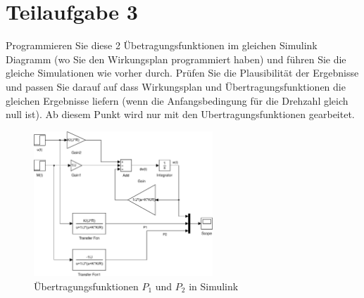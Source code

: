 \section{Teilaufgabe 3}
\begin{aufgabe}
Programmieren Sie diese 2 Übetragungsfunktionen im gleichen Simulink Diagramm 
(wo Sie den Wirkungsplan programmiert haben) und führen Sie die gleiche 
Simulationen wie vorher durch. Prüfen Sie die Plausibilität der Ergebnisse 
und passen Sie darauf auf dass Wirkungsplan und Übertragungsfunktionen die 
gleichen Ergebnisse liefern (wenn die Anfangsbedingung für die Drehzahl gleich 
null ist). Ab diesem Punkt wird nur mit den Ubertragungsfunktionen gearbeitet.
\end{aufgabe}
\begin{figure}[h!]
    \centering
    \includegraphics[width=0.6\textwidth]{03/transfer.pdf}
    \caption{Übertragungsfunktionen $P_1$ und $P_2$ in Simulink}
    \label{fig:03}
\end{figure}
